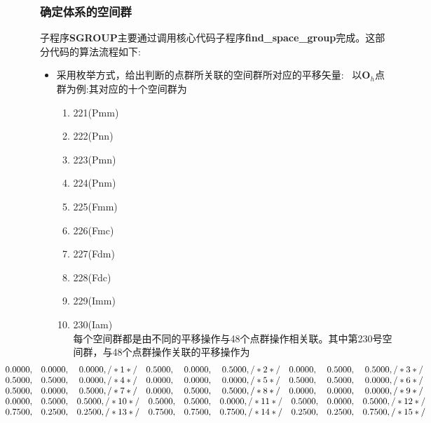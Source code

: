 \subsubsection{确定体系的空间群}
子程序\textbf{SGROUP}主要通过调用核心代码子程序\textbf{find\_space\_group}完成。这部分代码的算法流程如下:
\begin{itemize}
	\item 采用枚举方式，给出判断的点群所关联的空间群所对应的平移矢量:~
		以$\mathbf{O}_h$点群为例:其对应的十个空间群为
		\begin{enumerate}
			\item 221(P\;m\;-3\;m)
			\item 222(P\;n\;n) 
			\item 223(P\;m\;-3\;n)
			\item 224(P\;n\;m) 
			\item 225(F\;m\;-3\;m)
			\item 226(F\;m\;c)
			\item 227(F\;d\;m) 
			\item 228(F\;d\;c) 
			\item 229(I\;m\;-3\;m)
			\item 230(I\;a\;m)\\
				每个空间群都是由不同的平移操作与48个点群操作相关联。其中第230号空间群，与48个点群操作关联的平移操作为
				\begin{displaymath}
				\begin{matrix}
					\hspace*{-78pt}    0.0000, & 0.0000, & 0.0000, /*    1  */ \quad 0.5000, & 0.0000, & 0.5000, /*    2  */ \quad 0.0000, & 0.5000, & 0.5000, /*    3  */\\
 	\hspace*{-78pt}     0.5000, & 0.5000, & 0.0000, /*    4  */ \quad 0.0000, & 0.0000, & 0.0000, /*    5  */ \quad 0.5000, & 0.5000, & 0.0000, /*    6  */ \\
 	\hspace*{-78pt}     0.5000, & 0.0000, & 0.5000, /*    7  */ \quad 0.0000, & 0.5000, & 0.5000, /*    8  */ \quad 0.0000, & 0.0000, & 0.0000, /*    9  */ \\
 	\hspace*{-78pt}     0.0000, & 0.5000, & 0.5000, /*    10  */\quad 0.5000, & 0.5000, & 0.0000, /*    11  */\quad 0.5000, & 0.0000, & 0.5000, /*    12  */\\
 	\hspace*{-78pt}     0.7500, & 0.2500, & 0.2500, /*    13  */\quad 0.7500, & 0.7500, & 0.7500, /*    14  */\quad 0.2500, & 0.2500, & 0.7500, /*    15  */\\

\end{matrix}
\end{displaymath}
\end{enumerate}
\end{itemize}
